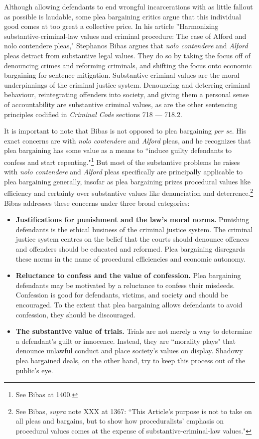 Although allowing defendants to end wrongful incarcerations with as little fallout as possible is laudable, some plea bargaining critics argue that this individual good comes at too great a collective price. In his article ''Harmonizing substantive-criminal-law values and criminal procedure: The case of Alford and nolo contendere pleas," Stephanos Bibas argues that \textit{nolo contendere} and \textit{Alford} pleas detract from substantive legal values. They do so by taking the focus off of denouncing crimes and reforming criminals, and shifting the focus onto economic bargaining for sentence mitigation. Substantive criminal values are the moral underpinnings of the criminal justice system. Denouncing and deterring criminal behaviour, reintegrating offenders into society, and giving them a personal sense of accountability are substantive criminal values, as are the other sentencing principles codified in \textit{Criminal Code} sections 718 — 718.2.

It is important to note that Bibas is not opposed to plea bargaining \textit{per se}. His exact concerns are with \textit{nolo contendere} and \textit{Alford} pleas, and he recognizes that plea bargaining has some value as a means to ``induce guilty defendants to confess and start repenting."\footnote{See Bibas at 1400.} But most of the substantive problems he raises with \textit{nolo contendere} and \textit{Alford} pleas specifically are principally applicable to plea bargaining generally, insofar as plea bargaining prizes procedural values like efficiency and certainty over substantive values like denunciation and deterrence.\footnote{See Bibas, \textit{supra} note XXX at 1367: ``This Article's purpose is not to take on all pleas and bargains, but to show how proceduralists' emphasis on procedural values comes at the expense of substantive-criminal-law values."} Bibas addresses these concerns under three broad categories:

\begin{itemize}
    \item \textbf{Justifications for punishment and the law's moral norms.} Punishing defendants is the ethical business of the criminal justice system. The criminal justice system centres on the belief that the courts should denounce offences and offenders should be educated and reformed. Plea bargaining disregards these norms in the name of procedural efficiencies and economic autonomy.
    \item \textbf{Reluctance to confess and the value of confession.} Plea bargaining defendants may be motivated by a reluctance to confess their misdeeds. Confession is good for defendants, victims, and society and should be encouraged. To the extent that plea bargaining allows defendants to avoid confession, they should be discouraged.
    \item \textbf{The substantive value of trials.} Trials are not merely a way to determine a defendant's guilt or innocence. Instead, they are ``morality plays" that denounce unlawful conduct and place society's values on display. Shadowy plea bargained deals, on the other hand, try to keep this process out of the public's eye.
\end{itemize}

